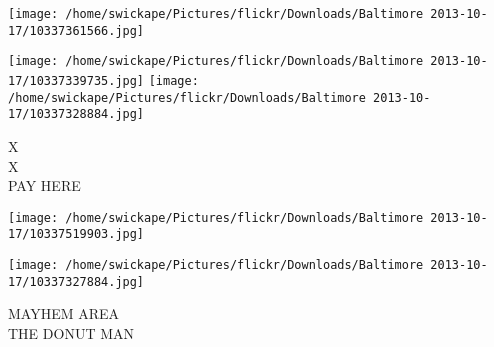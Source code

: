 \documentclass[10pt,letterpaper]{article}
\begin{document}
\texttt{[image: /home/swickape/Pictures/flickr/Downloads/Baltimore 2013-10-17/10337361566.jpg]}

\vspace{0.25in}
\texttt{[image: /home/swickape/Pictures/flickr/Downloads/Baltimore 2013-10-17/10337339735.jpg]}
\texttt{[image: /home/swickape/Pictures/flickr/Downloads/Baltimore 2013-10-17/10337328884.jpg]}

X\\
X\\
PAY HERE\\
\pagebreak

\texttt{[image: /home/swickape/Pictures/flickr/Downloads/Baltimore 2013-10-17/10337519903.jpg]}

\vspace{0.25in}
\texttt{[image: /home/swickape/Pictures/flickr/Downloads/Baltimore 2013-10-17/10337327884.jpg]}

MAYHEM AREA\\
THE DONUT MAN\\
\pagebreak
\end{document}

